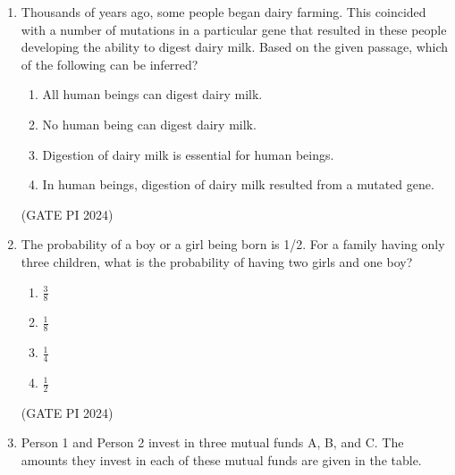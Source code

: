 \documentclass[journal,12pt,onecolumn]{IEEEtran}
\theoremstyle{remark}
\begin{document}
\begin{enumerate}
\begin{multicols}{4}
\begin{enumerate}
    \item 45,000
    \item 49,500
    \item 51,750
    \item 54,000
\end{enumerate}
\end{multicols}

\hfill (GATE PI 2024)

\item Thousands of years ago, some people began dairy farming. This coincided with a number of mutations in a particular gene that resulted in these people developing the ability to digest dairy milk.
Based on the given passage, which of the following can be inferred?

\begin{enumerate}
    \item All human beings can digest dairy milk.
    \item No human being can digest dairy milk.
    \item Digestion of dairy milk is essential for human beings.
    \item In human beings, digestion of dairy milk resulted from a mutated gene.
\end{enumerate}

\hfill (GATE PI 2024)

\item The probability of a boy or a girl being born is 1/2. For a family having only three children, what is the probability of having two girls and one boy?

\begin{multicols}{4}
\begin{enumerate}
    \item $\frac{3}{8}$
    \item $\frac{1}{8}$
    \item $\frac{1}{4}$
    \item $\frac{1}{2}$
\end{enumerate}
\end{multicols}

\hfill (GATE PI 2024)

\item Person 1 and Person 2 invest in three mutual funds A, B, and C. The amounts they invest in each of these mutual funds are given in the table.

       


\end{enumerate}
\end{document}
